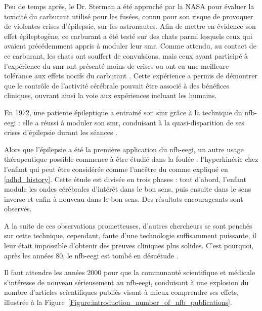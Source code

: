Peu de temps après, le Dr. Sterman a été approché par la NASA pour évaluer la toxicité du carburant utilisé pour les fusées, connu pour son risque de provoquer de violentes crises
d'épilepsie, sur les astronautes. Afin de mettre en évidence son effet épileptogène, ce carburant a été testé sur des chats parmi lesquels ceux qui avaient précédemment appris 
à moduler leur \gls{smr}. Comme attendu, au contact de ce carburant, les chats
ont souffert de convulsions, mais ceux ayant participé à l'expérience du \gls{smr} ont présenté moins de crises ou ont eu une meilleure tolérance aux effets nocifs du carburant \citep{Sterman1974}.  
Cette expérience a permis de démontrer que le contrôle de l'activité cérébrale pouvait être associé à des bénéfices cliniques, ouvrant ainsi la voie aux expériences incluant les humains.

En 1972, une patiente épileptique a entrainé son \gls{smr} grâce à la technique du \gls{nfb}-\gls{eegi} : elle a réussi à moduler son \gls{smr}, conduisant à la quasi-disparition de ses crises 
d'épilepsie durant les séances \citep{Sterman1974}. 

Alors que l'épilepsie a été la première application du \gls{nfb}-\gls{eegi}, un autre usage thérapeutique possible commence à être étudié dans la foulée : l'hyperkinésie chez l'enfant \citet{Lubar1976ADHD}
qui peut être considérée comme l'ancêtre du  comme expliqué en \ref{adhd_history}. Cette étude est divisée en trois phases : tout d'abord, l'enfant module les ondes cérébrales d'intérêt 
dans le bon sens, puis ensuite dans le sens inverse et enfin à nouveau dans le bon sens. Des résultats encourageants sont observés.

A la suite de ces observations prometteuses, d'autres chercheurs se sont penchés sur cette technique, cependant, faute d'une technologie suffisamment puissante, il leur était impossible
d'obtenir des preuves cliniques plus solides. C'est pourquoi, après les années 80, le \gls{nfb}-\gls{eegi} est tombé en désuétude \citep{Masterpasqua2003}.
 
Il faut attendre les années 2000 pour que la communauté scientifique et médicale s'intéresse de nouveau sérieusement au \gls{nfb}-\gls{eegi}, conduisant à une explosion du nombre d'articles scientifiques publiés 
visant à mieux comprendre ses effets, illustrée à la Figure~\ref{Figure:introduction_number_of_nfb_publications}. 

